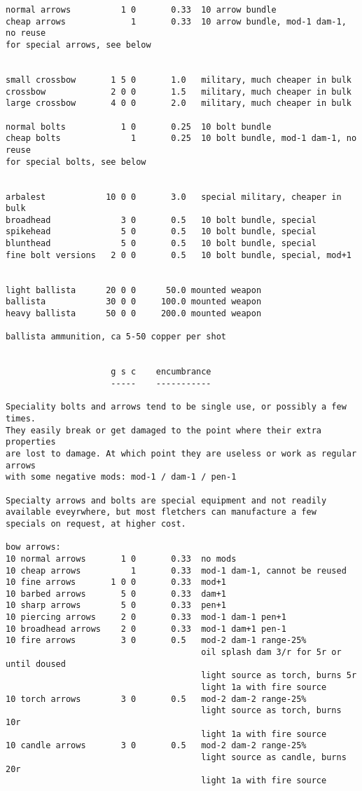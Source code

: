 \begin{verbatim}
normal arrows          1 0       0.33  10 arrow bundle
cheap arrows             1       0.33  10 arrow bundle, mod-1 dam-1, no reuse
for special arrows, see below


small crossbow       1 5 0       1.0   military, much cheaper in bulk
crossbow             2 0 0       1.5   military, much cheaper in bulk
large crossbow       4 0 0       2.0   military, much cheaper in bulk

normal bolts           1 0       0.25  10 bolt bundle
cheap bolts              1       0.25  10 bolt bundle, mod-1 dam-1, no reuse
for special bolts, see below


arbalest            10 0 0       3.0   special military, cheaper in bulk
broadhead              3 0       0.5   10 bolt bundle, special
spikehead              5 0       0.5   10 bolt bundle, special
blunthead              5 0       0.5   10 bolt bundle, special
fine bolt versions   2 0 0       0.5   10 bolt bundle, special, mod+1


light ballista      20 0 0      50.0 mounted weapon
ballista            30 0 0     100.0 mounted weapon
heavy ballista      50 0 0     200.0 mounted weapon

ballista ammunition, ca 5-50 copper per shot


                     g s c    encumbrance
                     -----    -----------

Speciality bolts and arrows tend to be single use, or possibly a few times.
They easily break or get damaged to the point where their extra properties
are lost to damage. At which point they are useless or work as regular arrows
with some negative mods: mod-1 / dam-1 / pen-1

Specialty arrows and bolts are special equipment and not readily available eveyrwhere, but most fletchers can manufacture a few specials on request, at higher cost.

bow arrows:
10 normal arrows       1 0       0.33  no mods
10 cheap arrows          1       0.33  mod-1 dam-1, cannot be reused
10 fine arrows       1 0 0       0.33  mod+1
10 barbed arrows       5 0       0.33  dam+1
10 sharp arrows        5 0       0.33  pen+1
10 piercing arrows     2 0       0.33  mod-1 dam-1 pen+1
10 broadhead arrows    2 0       0.33  mod-1 dam+1 pen-1
10 fire arrows         3 0       0.5   mod-2 dam-1 range-25%
                                       oil splash dam 3/r for 5r or until doused
                                       light source as torch, burns 5r
                                       light 1a with fire source
10 torch arrows        3 0       0.5   mod-2 dam-2 range-25%
                                       light source as torch, burns 10r
                                       light 1a with fire source
10 candle arrows       3 0       0.5   mod-2 dam-2 range-25%
                                       light source as candle, burns 20r
                                       light 1a with fire source


\end{verbatim}
